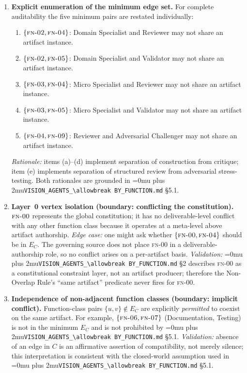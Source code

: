 \documentclass[12pt]{article}
\theoremstyle{definition}
\DeclareRobustCommand{\code}[1]{\begingroup\Urlmuskip=0mu plus 2mu\relax\nolinkurl{#1}\endgroup}
\newcommand{\FN}[1]{\textsc{fn-#1}}
\newcommand{\VisionFunc}{\code{VISION\_AGENTS\_\allowbreak BY\_FUNCTION.md}}
\begin{document}
\begin{enumerate}[label=\textbf{C\arabic*.}, leftmargin=*, widest=C9]
  \item \textbf{Explicit enumeration of the minimum edge set.}
        For complete auditability the five minimum pairs are restated
        individually:
        \begin{enumerate}[label=(\alph*), leftmargin=*]
          \item $\{\FN{02}, \FN{04}\}$: Domain Specialist and
                Reviewer may not share an artifact instance.
          \item $\{\FN{02}, \FN{05}\}$: Domain Specialist and
                Validator may not share an artifact instance.
          \item $\{\FN{03}, \FN{04}\}$: Micro Specialist and
                Reviewer may not share an artifact instance.
          \item $\{\FN{03}, \FN{05}\}$: Micro Specialist and
                Validator may not share an artifact instance.
          \item $\{\FN{04}, \FN{09}\}$: Reviewer and Adversarial
                Challenger may not share an artifact instance.
        \end{enumerate}
        \emph{Rationale:} items (a)--(d) implement separation of
        construction from critique; item (e) implements separation
        of structured review from adversarial stress-testing.
        Both rationales are grounded in \VisionFunc{} \S5.1.

  \item \textbf{Layer~0 vertex isolation (boundary: conflicting
        the constitution).}
        $\FN{00}$ represents the global constitution; it has no
        deliverable-level conflict with any other function class
        because it operates at a meta-level above artifact
        authorship.
        \emph{Edge case:} one might ask whether
        $\{\FN{00}, \FN{04}\}$ should be in $E_C$.
        The governing source does not place \FN{00} in a
        deliverable-authorship role, so no conflict arises on
        a per-artifact basis.
        \emph{Validation:} \VisionFunc{} \S2 describes \FN{00} as
        a constitutional constraint layer, not an artifact producer;
        therefore the Non-Overlap Rule's ``same artifact'' predicate
        never fires for \FN{00}.

  \item \textbf{Independence of non-adjacent function classes
        (boundary: implicit conflict).}
        Function-class pairs $\{u,v\} \notin E_C$ are explicitly
        \emph{permitted} to coexist on the same artifact.
        For example, $\{\FN{06}, \FN{07}\}$ (Documentation,
        Testing) is not in the minimum $E_C$ and is not prohibited
        by \VisionFunc{} \S5.1.
        \emph{Validation:} absence of an edge in $C$ is an
        affirmative assertion of compatibility, not merely silence;
        this interpretation is consistent with the closed-world
        assumption used in \VisionFunc{} \S5.1.

\end{enumerate}
\end{document}

